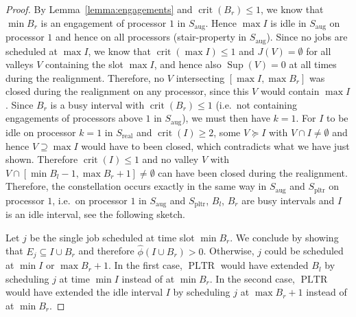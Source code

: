 \documentclass[a4paper]{article}
\DeclareMathOperator{\pltr}{pltr}
\DeclareMathOperator{\PLTR}{PLTR}
\DeclareMathOperator{\aug}{aug}
\DeclareMathOperator{\real}{real}
\DeclareMathOperator{\crit}{crit}
\DeclareMathOperator{\res}{Sup}
\begin{document}
\begin{proof}
  By Lemma~\ref{lemma:engagements} and $\crit(B_r) \leq 1$, we know that $\min B_r$ is an engagement of processor $1$ in $S_{\aug}$.
  Hence $\max I$ is idle in $S_{\aug}$ on processor $1$ and hence on all processors (stair-property in $S_{\aug}$).
  Since no jobs are scheduled at $\max I$, we know that $\crit(\max I) \leq 1$ and $J(V) = \emptyset$ for all valleys $V$ containing the slot $\max I$, and hence also $\res(V) = 0$ at all times during the realignment.
  Therefore, no $V$ intersecting $[\max I, \max B_r]$ was closed during the realignment on any processor, since this $V$ would contain $\max I$.
  Since $B_r$ is a busy interval with $\crit(B_r) \leq 1$ (i.e.\ not containing engagements of processors above $1$ in $S_{\aug}$), we must then have $k = 1$.
  For $I$ to be idle on processor $k = 1$ in $S_{\real}$ and $\crit(I) \geq 2$, some $V \succeq I$ with $V \cap I \neq \emptyset$ and hence $V \supseteq \max I$ would have to been closed, which contradicts what we have just shown.
  Therefore $\crit(I) \leq 1$ and no valley $V$ with $V \cap [\min B_l - 1, \max B_r + 1] \neq \emptyset$ can have been closed during the realignment.
  Therefore, the constellation occurs exactly in the same way in $S_{\aug}$ and $S_{\pltr}$ on processor $1$, i.e.\ on processor $1$ in $S_{\aug}$ and $S_{\pltr}$, $B_l$, $B_r$ are busy intervals and $I$ is an idle interval, see the following sketch.

  \begin{figure}[H]
    \centering
    
    \label{fig:constellation}
  \end{figure}
  Let $j$ be the single job scheduled at time slot $\min B_r$.
  We conclude by showing that $E_j \subseteq I \cup B_r$ and therefore $\hat \phi(I \cup B_r) > 0$.
  Otherwise, $j$ could be scheduled at $\min I$ or $\max B_r + 1$.
  In the first case, $\PLTR$ would have extended $B_l$ by scheduling $j$ at time $\min I$ instead of at $\min B_r$.
  In the second case, $\PLTR$ would have extended the idle interval $I$ by scheduling $j$ at $\max B_r + 1$ instead of at $\min B_r$.
\end{proof}
\end{document}
